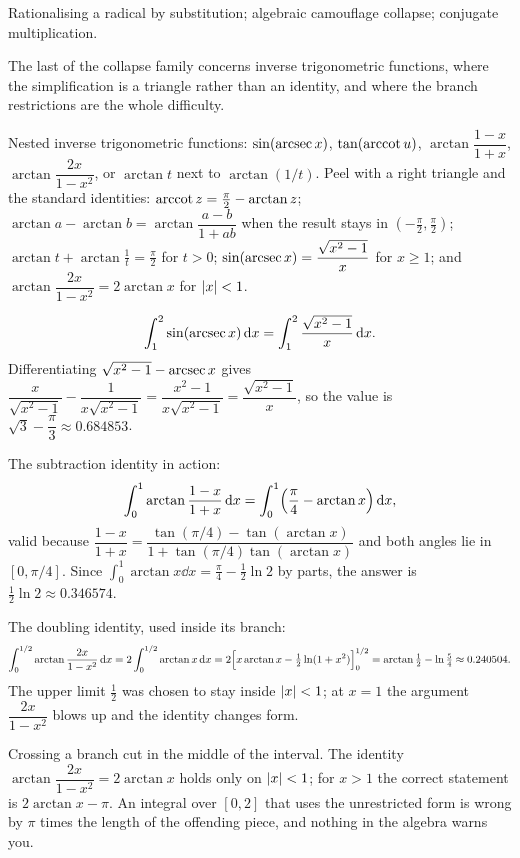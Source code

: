 \begin{seealsob}Rationalising a radical by substitution; algebraic camouflage collapse; conjugate multiplication.\end{seealsob}

The last of the collapse family concerns inverse trigonometric functions, where the simplification is a triangle rather than an identity, and where the branch restrictions are the whole difficulty.

\cue Nested inverse trigonometric functions: $\sin(\operatorname{arcsec} x)$, $\tan(\operatorname{arccot} u)$, $\arctan\dfrac{1-x}{1+x}$, $\arctan\dfrac{2x}{1-x^2}$, or $\arctan t$ next to $\arctan(1/t)$.
\method Peel with a right triangle and the standard identities: $\operatorname{arccot} z=\tfrac{\pi}{2}-\arctan z$; $\arctan a-\arctan b=\arctan\dfrac{a-b}{1+ab}$ when the result stays in $(-\tfrac{\pi}{2},\tfrac{\pi}{2})$; $\arctan t+\arctan\tfrac1t=\tfrac{\pi}{2}$ for $t>0$; $\sin(\operatorname{arcsec} x)=\dfrac{\sqrt{x^2-1}}{x}$ for $x\geq1$; and $\arctan\dfrac{2x}{1-x^2}=2\arctan x$ for $\left\lvert x\right\rvert<1$.

\begin{worked}
\[
\int_1^2\sin(\operatorname{arcsec} x)\,\mathrm{d} x=\int_1^2\frac{\sqrt{x^2-1}}{x}\,\mathrm{d} x .
\]
Differentiating $\sqrt{x^2-1}-\operatorname{arcsec} x$ gives $\dfrac{x}{\sqrt{x^2-1}}-\dfrac{1}{x\sqrt{x^2-1}}=\dfrac{x^2-1}{x\sqrt{x^2-1}}=\dfrac{\sqrt{x^2-1}}{x}$, so the value is $\sqrt3-\dfrac{\pi}{3}\approx0.684853$.

The subtraction identity in action:
\[
\int_0^1\arctan\frac{1-x}{1+x}\,\mathrm{d} x=\int_0^1\Bigl(\frac{\pi}{4}-\arctan x\Bigr)\,\mathrm{d} x ,
\]
valid because $\dfrac{1-x}{1+x}=\dfrac{\tan(\pi/4)-\tan(\arctan x)}{1+\tan(\pi/4)\tan(\arctan x)}$ and both angles lie in $[0,\pi/4]$. Since $\int_0^1\arctan x\dd x=\tfrac{\pi}{4}-\tfrac12\ln2$ by parts, the answer is $\tfrac12\ln2\approx0.346574$.

The doubling identity, used inside its branch:
\[
\int_0^{1/2}\arctan\frac{2x}{1-x^2}\,\mathrm{d} x=2\int_0^{1/2}\arctan x\,\mathrm{d} x
=2\Bigl[x\arctan x-\tfrac12\ln(1+x^2)\Bigr]_0^{1/2}=\arctan\tfrac12-\ln\tfrac54\approx0.240504 .
\]
The upper limit $\tfrac12$ was chosen to stay inside $\left\lvert x\right\rvert<1$; at $x=1$ the argument $\dfrac{2x}{1-x^2}$ blows up and the identity changes form.
\end{worked}

\begin{trap}
Crossing a branch cut in the middle of the interval. The identity $\arctan\dfrac{2x}{1-x^2}=2\arctan x$ holds only on $\left\lvert x\right\rvert<1$; for $x>1$ the correct statement is $2\arctan x-\pi$. An integral over $[0,2]$ that uses the unrestricted form is wrong by $\pi$ times the length of the offending piece, and nothing in the algebra warns you.
\end{trap}

